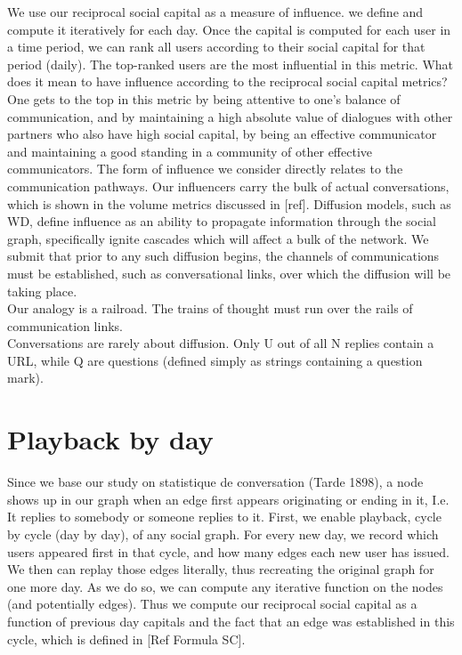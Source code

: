 \documentclass[10pt,oneside]{memoir}
\begin{document}
We use our reciprocal social capital as a measure of influence.  we define and compute it iteratively for each day.  Once the capital is computed for each user in a time period,  we can rank all users according to their social capital for that period (daily).  The top-ranked users are the most influential in this metric.
What does it mean to have influence according to the reciprocal social capital metrics?  One gets to the top in this metric by being attentive to one's balance of communication, and by maintaining a high absolute value of dialogues with other partners who also have high social capital, by being an effective communicator and maintaining a good standing in a community of other effective communicators.
The form of influence we consider directly relates to the communication pathways.  Our influencers carry the bulk of actual conversations, which is shown in the volume metrics discussed in [ref].  Diffusion models, such as WD, define influence as an ability to propagate information through the social graph, specifically ignite cascades which will affect a bulk of the network.  We submit that prior to any such diffusion begins, the channels of communications must be established, such as conversational links, over which the diffusion will be taking place. \\
Our analogy is a railroad.  The trains of thought must run over the rails of communication links. \\
Conversations are rarely about diffusion.  Only U out of all N replies contain a URL, while Q are questions (defined simply as strings containing a question mark).


\section{Playback by day}
\label{playbackbyday}

Since we base our study on statistique de conversation (Tarde 1898), a node shows up in our graph when an edge first appears originating or ending in it, I.e. It replies to somebody or someone replies to it.
First, we enable playback, cycle by cycle (day by day), of any social graph.  For every new day, we record which users appeared first in that cycle, and how many edges each new user has issued.
We then can replay those edges literally, thus recreating the original graph for one more day.  As we do so, we can compute any iterative function on the nodes (and potentially edges).  Thus we compute our reciprocal social capital as a function of previous day capitals and the fact that an edge was established in this cycle, which is defined in [Ref Formula SC].
\end{document}
